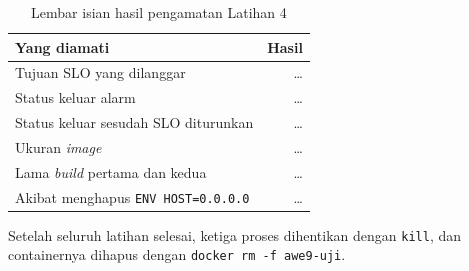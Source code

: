 \begin{table}[!htb]
  \centering
  \caption{Lembar isian hasil pengamatan Latihan 4}
  \label{tab:c9-lat4-hasil}
  \begin{tabularx}{\textwidth}{Xr}
    \hline
    \textbf{Yang diamati} & \textbf{Hasil} \\
    \hline
    Tujuan SLO yang dilanggar & \dots \\
    \hline
    Status keluar alarm & \dots \\
    \hline
    Status keluar sesudah SLO diturunkan & \dots \\
    \hline
    Ukuran \textit{image} & \dots \\
    \hline
    Lama \textit{build} pertama dan kedua & \dots \\
    \hline
    Akibat menghapus \texttt{ENV HOST=0.0.0.0} & \dots \\
    \hline
  \end{tabularx}
\end{table}

Setelah seluruh latihan selesai, ketiga proses dihentikan dengan
\texttt{kill}, dan containernya dihapus dengan
\texttt{docker rm -f awe9-uji}.
